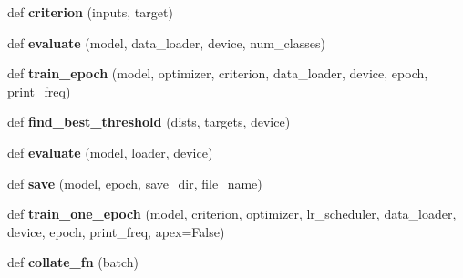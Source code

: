 \begin{DoxyCompactItemize}
def {\bfseries criterion} (inputs, target)
\item 
\mbox{\label{namespacetrain_a5ecf3f0162592b9cb769e7142d013976}} 
def {\bfseries evaluate} (model, data\+\_\+loader, device, num\+\_\+classes)
\item 
\mbox{\label{namespacetrain_ab786ebc714be39657d63bc3f54a0d2cd}} 
def {\bfseries train\+\_\+epoch} (model, optimizer, criterion, data\+\_\+loader, device, epoch, print\+\_\+freq)
\item 
\mbox{\label{namespacetrain_a8a919d65d2ab11f8c62b2906aee12952}} 
def {\bfseries find\+\_\+best\+\_\+threshold} (dists, targets, device)
\item 
\mbox{\label{namespacetrain_a2a88d7d76799389e9b432647996c6dc5}} 
def {\bfseries evaluate} (model, loader, device)
\item 
\mbox{\label{namespacetrain_ad8e24e09a3cd4b0b9ff48ea06185109b}} 
def {\bfseries save} (model, epoch, save\+\_\+dir, file\+\_\+name)
\item 
\mbox{\label{namespacetrain_a98a11c5f472ea2bcf38e74fdde280d16}} 
def {\bfseries train\+\_\+one\+\_\+epoch} (model, criterion, optimizer, lr\+\_\+scheduler, data\+\_\+loader, device, epoch, print\+\_\+freq, apex=False)
\item 
\mbox{\label{namespacetrain_a66ed234c9069226491244998adae0aac}} 
def {\bfseries collate\+\_\+fn} (batch)
\end{DoxyCompactItemize}
